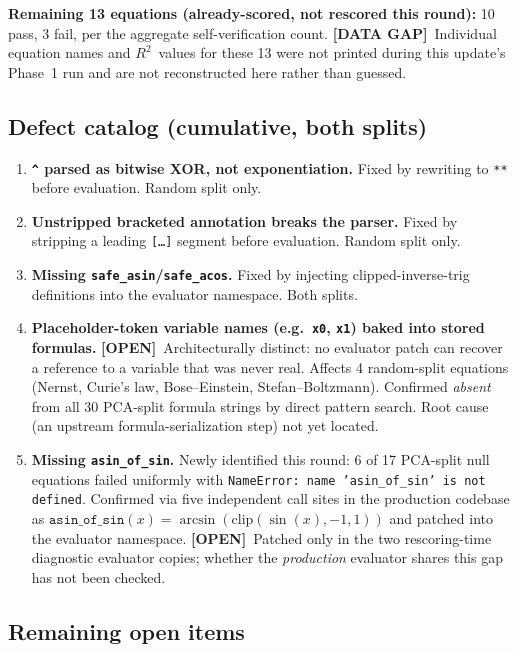 \documentclass[11pt]{article}
\newcommand{\rtwo}{$R^2$}
\newcommand{\open}{\textcolor{red!60!black}{\textbf{[OPEN]}}}
\newcommand{\gap}{\textcolor{purple!60!black}{\textbf{[DATA GAP]}}}
\begin{document}
\noindent\textbf{Remaining 13 equations (already-scored, not rescored
this round):} 10 pass, 3 fail, per the aggregate self-verification count.
\gap\ Individual equation names and \rtwo\ values for these 13 were not
printed during this update's Phase~1 run and are not reconstructed here
rather than guessed.

\subsection*{Defect catalog (cumulative, both splits)}

\begin{enumerate}
\item \textbf{\texttt{\textasciicircum} parsed as bitwise XOR, not
exponentiation.} Fixed by rewriting to \texttt{**} before evaluation.
Random split only.
\item \textbf{Unstripped bracketed annotation breaks the parser.} Fixed
by stripping a leading \texttt{[\ldots]} segment before evaluation.
Random split only.
\item \textbf{Missing \texttt{safe\_asin}/\texttt{safe\_acos}.} Fixed by
injecting clipped-inverse-trig definitions into the evaluator namespace.
Both splits.
\item \textbf{Placeholder-token variable names (e.g.\ \texttt{x0},
\texttt{x1}) baked into stored formulas.} \open\ Architecturally
distinct: no evaluator patch can recover a reference to a variable that
was never real. Affects 4 random-split equations (Nernst, Curie's law,
Bose--Einstein, Stefan--Boltzmann). Confirmed \emph{absent} from all 30
PCA-split formula strings by direct pattern search. Root cause (an
upstream formula-serialization step) not yet located.
\item \textbf{Missing \texttt{asin\_of\_sin}.} Newly identified this
round: 6 of 17 PCA-split null equations failed uniformly with
\texttt{NameError: name 'asin\_of\_sin' is not defined}. Confirmed via
five independent call sites in the production codebase as
$\texttt{asin\_of\_sin}(x)=\arcsin(\mathrm{clip}(\sin(x),-1,1))$ and
patched into the evaluator namespace. \open\ Patched only in the two
rescoring-time diagnostic evaluator copies; whether the \emph{production}
evaluator shares this gap has not been checked.
\end{enumerate}

\subsection*{Remaining open items}
\end{document}
